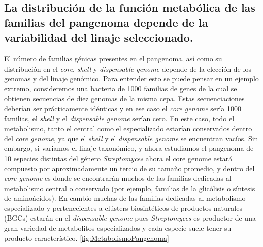 \documentclass[]{article}
\begin{document}
\subsection{La distribución de la función metabólica de las familias del
pangenoma depende de la variabilidad del linaje
seleccionado.}\label{la-distribucion-de-la-funcion-metabolica-de-las-familias-del-pangenoma-depende-de-la-variabilidad-del-linaje-seleccionado.}

El número de familias génicas presentes en el pangenoma, así como su
distribución en el \emph{core}, \emph{shell} y \emph{dispensable genome}
depende de la elección de los genomas y del linaje genómico. Para
entender esto se puede pensar en un ejemplo extremo, consideremos una
bacteria de 1000 familias de genes de la cual se obtienen secuencias de
diez genomas de la misma cepa. Estas secuenciaciones deberían ser
prácticamente idénticas y en ese caso el \emph{core genome} sería 1000
familias, el \emph{shell} y el \emph{dispensable genome} serían cero. En
este caso, todo el metabolismo, tanto el central como el especializado
estarían conservados dentro del \emph{core genome}, ya que el
\emph{shell} y el \emph{dispensable genome} se encuentran vacíos. Sin
embargo, si variamos el linaje taxonómico, y ahora estudiamos el
pangenoma de 10 especies distintas del género \emph{Streptomyces} ahora
el core genome estará compuesto por aproximadamente un tercio de su
tamaño promedio, y dentro del \emph{core genome} es donde se encontrarán
muchos de las familias dedicadas al metabolismo central o conservado
(por ejemplo, familias de la glicólisis o síntesis de aminoácidos). En
cambio muchas de las familias dedicadas al metabolismo especializado y
pertenecientes a clústers biosintéticos de productos naturales (BGCs)
estarán en el \emph{dispensable genome} pues \emph{Streptomyces} es
productor de una gran variedad de metabolitos especializados y cada
especie suele tener su producto característico.
\autoref{fig:MetabolismoPangenoma}
\end{document}
